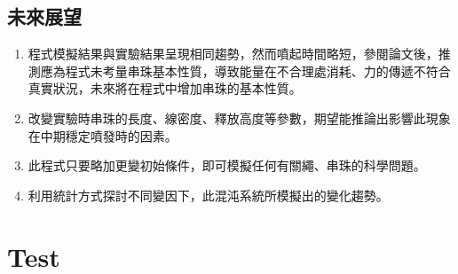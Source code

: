 \documentclass[11pt,twoside,b5paper]{article}
\begin{document}
\subsection{未來展望}
\begin{enumerate}
    \item 程式模擬結果與實驗結果呈現相同趨勢，然而噴起時間略短，參閱論文後，推測應為程式未考量串珠基本性質，導致能量在不合理處消耗、力的傳遞不符合真實狀況，未來將在程式中增加串珠的基本性質。
    \item 改變實驗時串珠的長度、線密度、釋放高度等參數，期望能推論出影響此現象在中期穩定噴發時的因素。
    \item 此程式只要略加更變初始條件，即可模擬任何有關繩、串珠的科學問題。
    \item 利用統計方式探討不同變因下，此混沌系統所模擬出的變化趨勢。
\end{enumerate}

\section{Test}

\medskip
\renewcommand{\refname}{\S\quad 參考資料}
\nocite{*}


\end{document}
